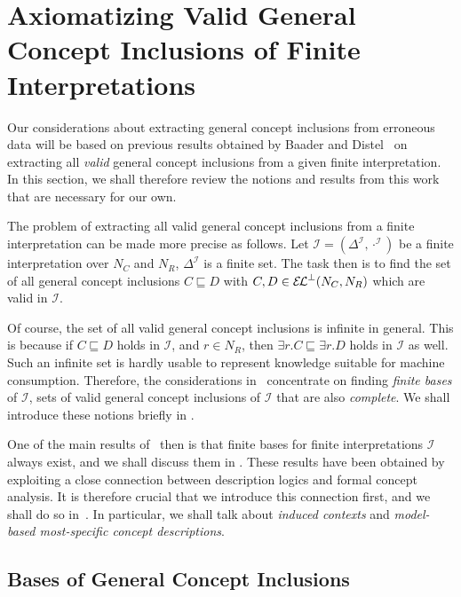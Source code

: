\chapter{Axiomatizing Valid General Concept Inclusions of Finite
  Interpretations}
\label{cha:axiom-valid-el}

Our considerations about extracting general concept inclusions from erroneous data will be
based on previous results obtained by Baader and Distel~\cite{Diss-Felix} on extracting
all \emph{valid} general concept inclusions from a given finite interpretation.  In this
section, we shall therefore review the notions and results from this work that are
necessary for our own.

The problem of extracting all valid general concept inclusions from a finite
interpretation can be made more precise as follows.  Let $\mathcal{I} =
(\Delta^{\mathcal{I}}, \cdot^{\mathcal{I}})$ be a finite interpretation over $N_C$ and
$N_R$, \ie $\Delta^{\mathcal{I}}$ is a finite set.  The task then is to find the set of
all general concept inclusions $C \sqsubseteq D$ with $C, D \in {\ensuremath{{\mathcal{E}\kern-.3ex\mathcal{L}}^\bot}}(N_C, N_R)$ which
are valid in $\mathcal{I}$.

Of course, the set of all valid general concept inclusions is infinite in general.  This
is because if $C \sqsubseteq D$ holds in $\mathcal{I}$, and $r \in N_R$, then $\exists
r. C \sqsubseteq \exists r. D$ holds in $\mathcal{I}$ as well.  Such an infinite set is
hardly usable to represent knowledge suitable for machine consumption.  Therefore, the
considerations in~\cite{Diss-Felix} concentrate on finding \emph{finite bases} of
$\mathcal{I}$, \ie sets of valid general concept inclusions of $\mathcal{I}$ that are also
\emph{complete}.  We shall introduce these notions briefly in .

One of the main results of~\cite{Diss-Felix} then is that finite bases for finite
interpretations $\mathcal{I}$ always exist, and we shall discuss them in
.  These results have been obtained by exploiting a close
connection between description logics and formal concept analysis.  It is therefore
crucial that we introduce this connection first, and we shall do so
in~.  In particular, we shall talk about \emph{induced contexts} and
\emph{model-based most-specific concept descriptions}.

\section{Bases of General Concept Inclusions}
\label{sec:bases-gener-conc}

